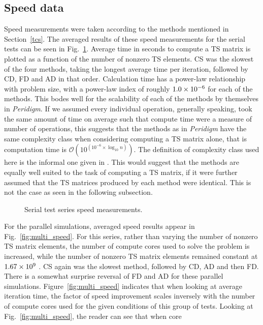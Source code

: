 \documentclass[preprint,12pt]{elsarticle}
\begin{document}
\subsection{Speed data} 

Speed measurements were taken according to the methods
mentioned in Section~\ref{tcs}. The averaged results of these speed
measurements for the serial tests can be seen in Fig.~\ref{fig:serial_speed}.
Average time in seconds to compute a TS matrix is plotted as a function of the
number of nonzero TS elements.  CS was the slowest of the four methods, taking
the longest average time per iteration,  followed by CD, FD and AD in that
order. Calculation time has a power-law relationship with problem size, with a
power-law index of roughly $\num{1.0E-6}$ for each of the methods. This bodes well
for the scalability of each of the methods by themselves in \emph{Peridigm}. If we
assumed every individual operation, generally speaking, took the same amount of
time on average such that compute time were a measure of number of operations,
this suggests that the methods as in \emph{Peridigm} have the same complexity class
when considering computing a TS matrix alone, that is
computation time is $\mathcal{O}(10^{(10^{-6} \times \log_{10}n)})$. The definition of 
complexity class used here is the informal one given in \cite[pp. 1059]{cormen2009introduction}. This would
suggest that the methods are equally well suited to the task of computing a TS matrix, if it were further assumed
that the TS matrices produced by each method were identical. This is not the case
as seen in the following subsection.
%
\begin{figure}[tbp] \centering \scalebox{1.0}{}
\caption{Serial test series speed measurements.} \label{fig:serial_speed}
\end{figure}
%
For the parallel simulations, averaged speed results appear in
Fig.~\ref{fig:multi_speed}. For this series, rather than varying the number of
nonzero TS matrix elements, the number of compute cores used to solve the
problem is increased, while the number of nonzero TS matrix elements remained
constant at $\num{1.67E9}$ .  CS again was the slowest method, followed by CD,
AD and then FD.  There is a somewhat surprise reversal of FD and AD for these
parallel simulations.  Figure~\ref{fig:multi_speed} indicates that when looking
at average iteration time, the factor of speed improvement scales inversely with
the number of compute cores used for the given conditions of this group of
tests. Looking at Fig.~\ref{fig:multi_speed}, the reader can see that when core
\end{document}
